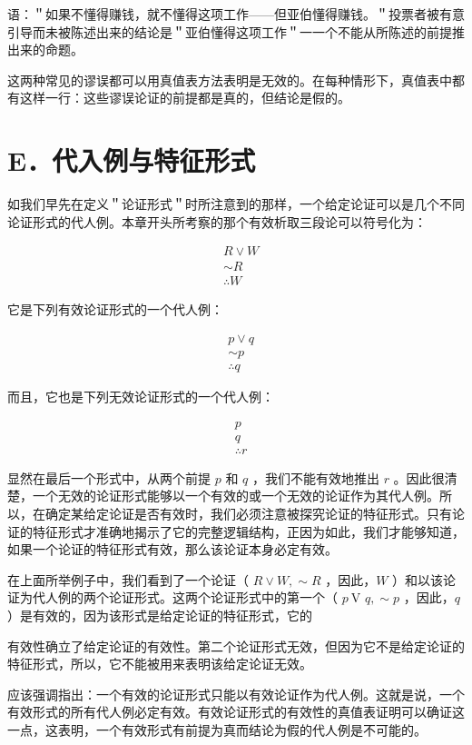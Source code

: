 语：＂如果不懂得赚钱，就不懂得这项工作——但亚伯懂得赚钱。＂投票者被有意引导而未被陈述出来的结论是＂亚伯懂得这项工作＂一一个不能从所陈述的前提推出来的命题。

这两种常见的谬误都可以用真值表方法表明是无效的。在每种情形下，真值表中都有这样一行：这些谬误论证的前提都是真的，但结论是假的。

\section*{E．代入例与特征形式}
如我们早先在定义＂论证形式＂时所注意到的那样，一个给定论证可以是几个不同论证形式的代人例。本章开头所考察的那个有效析取三段论可以符号化为：

$$
\begin{aligned}
& R \vee W \\
& \sim R \\
& \therefore W
\end{aligned}
$$

它是下列有效论证形式的一个代人例：

$$
\begin{aligned}
& p \vee q \\
& \sim p \\
& \therefore q
\end{aligned}
$$

而且，它也是下列无效论证形式的一个代人例：

$$
\begin{aligned}
& p \\
& q \\
& \therefore r
\end{aligned}
$$

显然在最后一个形式中，从两个前提 $p$ 和 $q$ ，我们不能有效地推出 $r$ 。因此很清楚，一个无效的论证形式能够以一个有效的或一个无效的论证作为其代人例。所以，在确定某给定论证是否有效时，我们必须注意被探究论证的特征形式。只有论证的特征形式才准确地揭示了它的完整逻辑结构，正因为如此，我们才能够知道，如果一个论证的特征形式有效，那么该论证本身必定有效。

在上面所举例子中，我们看到了一个论证（ $R \vee W, \sim R$ ，因此，$W$ ）和以该论证为代人例的两个论证形式。这两个论证形式中的第一个（ $p \mathrm{~V}$ $q, \sim p$ ，因此，$q$ ）是有效的，因为该形式是给定论证的特征形式，它的

有效性确立了给定论证的有效性。第二个论证形式无效，但因为它不是给定论证的特征形式，所以，它不能被用来表明该给定论证无效。

应该强调指出：一个有效的论证形式只能以有效论证作为代人例。这就是说，一个有效形式的所有代人例必定有效。有效论证形式的有效性的真值表证明可以确证这一点，这表明，一个有效形式有前提为真而结论为假的代人例是不可能的。 